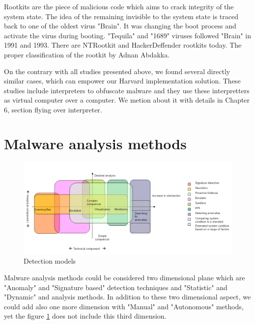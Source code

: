 Rootkits are the piece of malicious code which aims to crack integrity of the system state. The idea of the remaining invisible to the system state is traced back to one of the oldest virus "Brain"\cite{martin2008}. It was changing the boot process and activate the virus during booting. "Tequila" and "1689" viruses followed "Brain" in 1991 and 1993\cite{Ducklin1991}. There are NTRootkit and HackerDeffender rootkits today. The proper classification of the rootkit  by Adnan Abdakka\cite{Adnan2011}.

On the contrary with all studies presented above, we found several directly similar cases\cite{sparks2005shadow}\cite{yan2008revealing}, which can empower our Harvard implementation solution. These studies include interpreters to obfuscate malware and they use these interpretters as virtual computer over a computer. We metion about it with details in Chapter 6, section flying over interpreter. 

\section{Malware analysis methods}

\begin{figure}[h]
    \centering
    \includegraphics[width=1\textwidth]{img/alisa_1007_pic1_en.jpg}
    \caption{Detection models \cite{Shevchenko2007detc}}
    \label{fig:awesome_image}
\end{figure}
Malware analysis methods could be considered two dimensional plane which are "Anomaly" and "Signature based" detection techniques and "Statistic" and "Dynamic" and analysis methods. In addition to these two dimensional aspect, we could add also one more dimension with "Manual" and "Autonomous" methods, yet the figure \ref{fig:awesome_image} does not include this third dimension.


